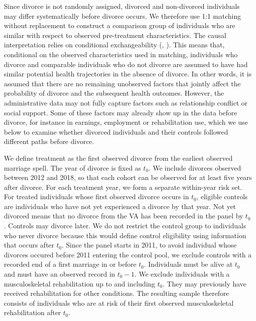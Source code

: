 \documentclass[a4paper,12pt]{article}
\theoremstyle{plain}
\theoremstyle{definition}
\theoremstyle{TheoremNum}
\theoremstyle{CorollaryNum}
\theoremstyle{PropositionNum}
\theoremstyle{TheoremNum}
\begin{document}
Since divorce is not randomly assigned, divorced and non-divorced individuals may differ systematically before divorce occurs. We therefore use 1:1 matching without replacement to construct a comparison group of individuals who are similar with respect to observed pre-treatment characteristics. The causal interpretation relies on conditional exchangeability (\citeauthor{rosenbaum1983central}, \citeyear{rosenbaum1983central}). This means that, conditional on the observed characteristics used in matching, individuals who divorce and comparable individuals who do not divorce are assumed to have had similar potential health trajectories in the absence of divorce. In other words, it is assumed that there are no remaining unobserved factors that jointly affect the probability of divorce and the subsequent health outcomes. However, the administrative data may not fully capture factors such as relationship conflict or social support. Some of these factors may already show up in the data before divorce, for instance in earnings, employment or rehabilitation use, which we use below to examine whether divorced individuals and their controls followed different paths before divorce.

We define treatment as the first observed divorce from the earliest observed marriage spell. The year of divorce is fixed as $t_0$. We include divorces observed between 2012 and 2018, so that each cohort can be observed for at least five years after divorce. For each treatment year, we form a separate within-year risk set. For treated individuals whose first observed divorce occurs in $t_0$, eligible controls are individuals who have not yet experienced a divorce by that year. Not yet divorced means that no divorce from the VA has been recorded in the panel by $t_0$. Controls may divorce later. We do not restrict the control group to individuals who never divorce because this would define control eligibility using information that occurs after $t_0$.  Since the panel starts in 2011, to avoid individual whose divorces occured before 2011 entering the control pool, we exclude controls with a recorded end of a first marriage in or before $t_0$. Individuals must be alive at $t_0$ and must have an observed record in $t_{0}-1$. We exclude individuals with a musculoskeletal rehabilitation up to and including $t_{0}$. They may previously have received rehabilitation for other conditions. The resulting sample therefore consists of individuals who are at risk of their first observed musculoskeletal rehabilitation after $t_0$.
\end{document}
